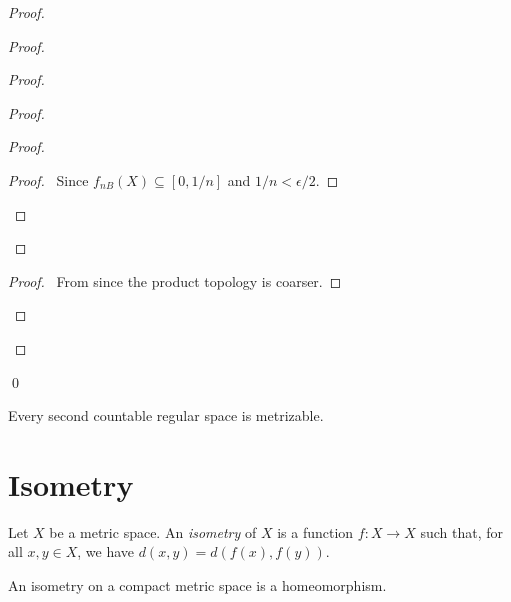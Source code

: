 \begin{proof}
\begin{proof}
\begin{proof}
\begin{proof}
                \begin{proof}
                    \begin{proof}
                        \pf\ Since $f_{nB}(X) \subseteq [0,1/n]$ and $1/n < \epsilon / 2$.
                    \end{proof}
                \end{proof}
            \end{proof}
            \begin{proof}
                \pf\ From  since the product topology is coarser.
            \end{proof}
        \end{proof}
    \end{proof}
    \qed
\end{proof}

\begin{corollary}
    Every second countable regular space is metrizable.
\end{corollary}

\section{Isometry}

\begin{definition}[Isometry]
    Let $X$ be a metric space. An \emph{isometry} of $X$ is a function
    $f : X \rightarrow X$ such that, for all $x, y \in X$, we have
    $d(x,y) = d(f(x),f(y))$.    
\end{definition}

\begin{proposition}
    An isometry on a compact metric space is a homeomorphism.
\end{proposition}

